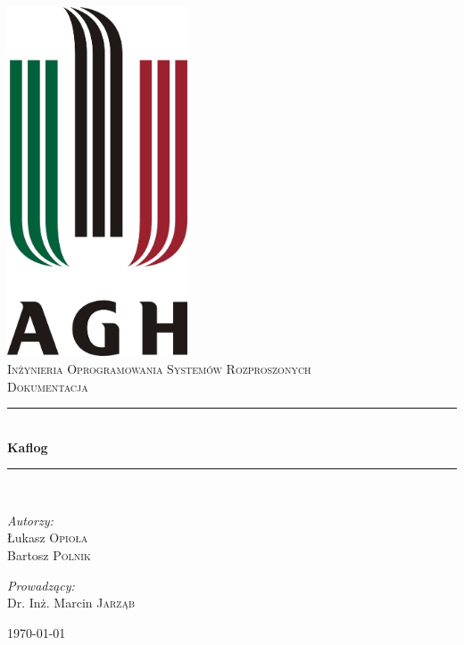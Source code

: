 \documentclass[a4paper,11pt]{article}
\newcommand{\HRule}{\rule{\linewidth}{0.5mm}}
\begin{document}
\begin{titlepage}
    \begin{center}
        \includegraphics[width=0.4\textwidth]{images/logo.jpg} \\[1cm]
        \textsc{\LARGE Inżynieria Oprogramowania Systemów Rozproszonych} \\[0.8cm]
        \textsc{\LARGE Dokumentacja} \\[0.5cm]
        \HRule \\[0.4cm]
        { \huge \bfseries Kaflog} \\[0.4cm]
        \HRule \\[1.5cm]
    
    \begin{minipage}{0.4\textwidth}
        \begin{flushleft} \large
        \emph{Autorzy:} \\
        Łukasz \textsc{Opioła} \\
        Bartosz \textsc{Polnik}
        \end{flushleft}
    \end{minipage}
    \begin{minipage}{0.4\textwidth}
        \begin{flushright} \large
            \emph{Prowadzący:} \\
            Dr. Inż. Marcin \textsc{Jarząb}
        \end{flushright}
    \end{minipage}

    \vfill

    {\large \today}

    \end{center}
\end{titlepage}
\end{document}
